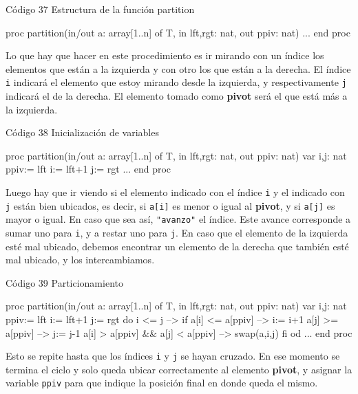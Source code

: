 \begin{codebox}{Código 37}
\footnotesize Estructura de la función partition
\tcblower
\begin{pascallike}
proc partition(in/out a: array[1..n] of T, in lft,rgt: nat, out ppiv: nat)
...
end proc
\end{pascallike}
\end{codebox}
Lo que hay que hacer en este procedimiento es ir mirando con un índice los elementos que están a la izquierda y con otro los que están a la derecha. El índice \texttt{i} indicará el elemento que estoy mirando desde la izquierda, y respectivamente \texttt{j} indicará el de la derecha. El elemento tomado como \textbf{pivot} será el que está más a la izquierda.
\begin{codebox}{Código 38}
\footnotesize Inicialización de variables
\tcblower
\begin{pascallike}
proc partition(in/out a: array[1..n] of T, in lft,rgt: nat, out ppiv: nat)
    var i,j: nat
    ppiv:= lft
    i:= lft+1
    j:= rgt
    ...
end proc
\end{pascallike}
\end{codebox}
Luego hay que ir viendo si el elemento indicado con el índice \texttt{i} y el indicado con \texttt{j} están bien ubicados, es decir, si \texttt{a[i]} es menor o igual al \textbf{pivot}, y si \texttt{a[j]} es mayor o igual. En caso que sea así, \texttt{"avanzo"} el índice. Este avance corresponde a sumar uno para \texttt{i}, y a restar uno para \texttt{j}. En caso que el elemento de la izquierda esté mal ubicado, debemos encontrar un elemento de la derecha que también esté mal ubicado, y los intercambiamos.
\begin{codebox}{Código 39}
\footnotesize Particionamiento
\tcblower
\begin{pascallike}
proc partition(in/out a: array[1..n] of T, in lft,rgt: nat, out ppiv: nat)
    var i,j: nat
    ppiv:= lft
    i:= lft+1
    j:= rgt
    do i <= j -->
        if a[i] <= a[ppiv] --> i:= i+1
            a[j] >= a[ppiv] --> j:= j-1
            a[i] > a[ppiv] && a[j] < a[ppiv] --> swap(a,i,j)
        fi
    od
...
end proc
\end{pascallike}
\end{codebox}
Esto se repite hasta que los índices \texttt{i} y \texttt{j} se hayan cruzado. En ese momento se termina el ciclo y solo queda ubicar correctamente al elemento \textbf{pivot}, y asignar la variable \texttt{ppiv} para que indique la posición final en donde queda el mismo.

